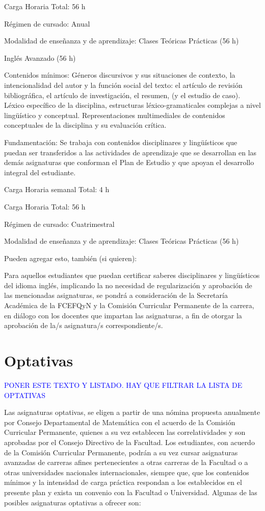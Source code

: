 \documentclass[a4paper, 12pt]{article}
\begin{document}
Carga Horaria Total: 56 h

Régimen de cursado: Anual

Modalidad de enseñanza y de aprendizaje: Clases Teóricas Prácticas (56 h)

 

Inglés Avanzado (56 h)

 

Contenidos mínimos: Géneros discursivos y sus situaciones de contexto, la intencionalidad del autor y la función social del texto: el artículo de revisión bibliográfica, el artículo de investigación, el resumen, (y el estudio de caso). Léxico específico de la disciplina, estructuras léxico-gramaticales complejas a nivel lingüístico y conceptual. Representaciones multimediales de contenidos conceptuales de la disciplina y su evaluación crítica.


Fundamentación: Se trabaja con contenidos disciplinares y lingüísticos que puedan ser transferidos a las actividades de aprendizaje que se desarrollan en las demás asignaturas que conforman el Plan de Estudio y que apoyan el desarrollo integral del estudiante.

 

Carga Horaria semanal Total: 4 h

Carga Horaria Total: 56 h

Régimen de cursado: Cuatrimestral

Modalidad de enseñanza y de aprendizaje: Clases Teóricas Prácticas (56 h)

 

Pueden agregar esto, también (si quieren):

 

Para aquellos estudiantes que puedan certificar saberes disciplinares y lingüísticos del idioma inglés, implicando la no necesidad de regularización y aprobación de las mencionadas asignaturas, se pondrá a consideración de la Secretaría Académica de la FCEFQyN y la Comisión Curricular Permanente de la carrera, en diálogo con los docentes que impartan las asignaturas, a fin de otorgar la aprobación de la/s asignatura/s correspondiente/s.

\section{Optativas  }
\textcolor{blue}{PONER ESTE TEXTO Y LISTADO. HAY QUE FILTRAR LA LISTA DE OPTATIVAS}

Las asignaturas optativas, se eligen a partir de una nómina propuesta anualmente por Consejo Departamental de Matemática con el acuerdo de la Comisión Curricular Permanente, quienes a su vez establecen las correlatividades y son aprobadas por el Consejo Directivo de la Facultad. Los estudiantes, con acuerdo de la Comisión Curricular
Permanente, podrán a su vez cursar asignaturas avanzadas de carreras afines pertenecientes a otras carreras de la Facultad o a otras universidades nacionales internacionales, siempre que, que los contenidos mínimos y la intensidad de carga
práctica respondan a los establecidos en el presente plan y exista un convenio con la Facultad o Universidad.
Algunas de las posibles asignaturas optativas a ofrecer son:
\end{document}
